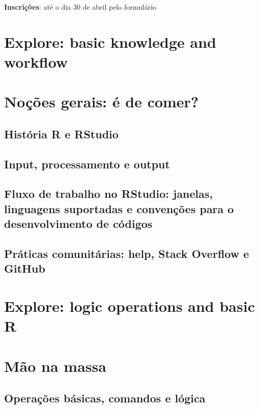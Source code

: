 \documentclass[a4paper,12pt]{article}
\begin{document}
\vspace{0.5cm}

\textbf{Inscrições}: até o dia 30 de abril pelo formulário 



\section{Explore: basic knowledge and workflow}
\section*{Noções gerais: é de comer?}
\subsection*{História R e RStudio}
\subsection*{Input, processamento e output}
\subsection*{Fluxo de trabalho no RStudio: janelas, linguagens suportadas e convenções para o desenvolvimento de códigos}
\subsection*{Práticas comunitárias: help, Stack Overflow e GitHub}

\section{Explore: logic operations and basic R}
\section*{Mão na massa}
\subsection*{Operações básicas, comandos e lógica}
\end{document}
